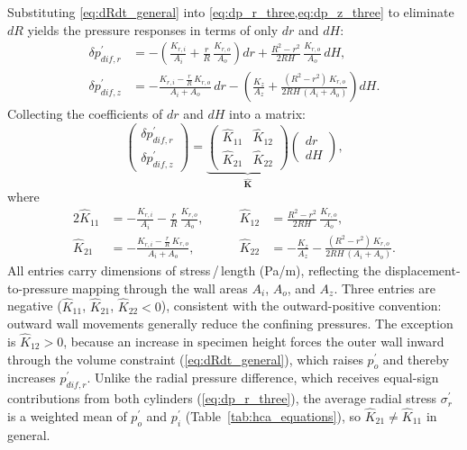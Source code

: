 \documentclass[a4paper,fleqn]{cas-sc}
\begin{document}
Substituting \cref{eq:dRdt_general} into \cref{eq:dp_r_three,eq:dp_z_three} to eliminate $dR$ yields the pressure responses in terms of only $dr$ and $dH$:
\begin{align}
\delta p_{dif,r}^{\prime}
  &= -\!\left(\frac{K_{r,i}}{A_i}+\frac{r}{R}\,\frac{K_{r,o}}{A_o}\right)dr
     +\frac{R^2-r^2}{2RH}\,\frac{K_{r,o}}{A_o}\,dH, \label{eq:dp_r_two}\\[6pt]
\delta p_{dif,z}^{\prime}
  &= -\frac{K_{r,i}-\frac{r}{R}\,K_{r,o}}{A_i+A_o}\,dr
     -\!\left(\frac{K_z}{A_z}+\frac{(R^2-r^2)\,K_{r,o}}{2RH\,(A_i+A_o)}\right)dH. \label{eq:dp_z_two}
\end{align}
Collecting the coefficients of $dr$ and $dH$ into a matrix:
\begin{equation}
\begin{pmatrix} \delta p_{dif,r}^{\prime} \\[4pt] \delta p_{dif,z}^{\prime} \end{pmatrix}
=
\underbrace{\begin{pmatrix} \hat{K}_{11} & \hat{K}_{12} \\[8pt] \hat{K}_{21} & \hat{K}_{22} \end{pmatrix}}_{\hat{\mathbf{K}}}
\begin{pmatrix} dr \\[4pt] dH \end{pmatrix},
\label{eq:stiffness_matrix}
\end{equation}
where
\begin{alignat}{2}
\hat{K}_{11} &= -\frac{K_{r,i}}{A_i}-\frac{r}{R}\,\frac{K_{r,o}}{A_o}, &\qquad
\hat{K}_{12} &= \frac{R^2-r^2}{2RH}\,\frac{K_{r,o}}{A_o}, \label{eq:Khat_row1}\\[4pt]
\hat{K}_{21} &= -\frac{K_{r,i}-\frac{r}{R}\,K_{r,o}}{A_i+A_o}, &\qquad
\hat{K}_{22} &= -\frac{K_z}{A_z}-\frac{(R^2-r^2)\,K_{r,o}}{2RH\,(A_i+A_o)}. \label{eq:Khat_row2}
\end{alignat}
All entries carry dimensions of stress\,/\,length (Pa/m), reflecting the displacement-to-pressure mapping through the wall areas $A_i$, $A_o$, and $A_z$. Three entries are negative ($\hat{K}_{11}$, $\hat{K}_{21}$, $\hat{K}_{22}<0$), consistent with the outward-positive convention: outward wall movements generally reduce the confining pressures. The exception is $\hat{K}_{12}>0$, because an increase in specimen height forces the outer wall inward through the volume constraint (\cref{eq:dRdt_general}), which raises $p_o^{\prime}$ and thereby increases $p_{dif,r}^{\prime}$. Unlike the radial pressure difference, which receives equal-sign contributions from both cylinders (\cref{eq:dp_r_three}), the average radial stress $\sigma_r^{\prime}$ is a weighted mean of $p_o^{\prime}$ and $p_i^{\prime}$ (Table~\ref{tab:hca_equations}), so $\hat{K}_{21}\neq\hat{K}_{11}$ in general.
\end{document}
